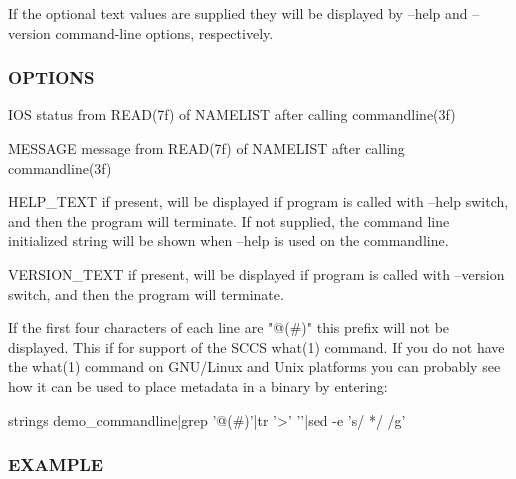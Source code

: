 If the optional text values are supplied they will be displayed by --help and --version command-\/line options, respectively.

\subsubsection*{O\+P\+T\+I\+O\+NS}

\begin{DoxyVerb} IOS           status from READ(7f) of NAMELIST after calling
               commandline(3f)

 MESSAGE       message from READ(7f) of NAMELIST after calling
               commandline(3f)

 HELP_TEXT     if present, will be displayed if program is called with
               --help switch, and then the program will terminate. If
               not supplied, the command line initialized string will be
               shown when --help is used on the commandline.

 VERSION_TEXT  if present, will be displayed if program is called with
               --version switch, and then the program will terminate.

    If the first four characters of each line are "@(#)" this prefix will
    not be displayed. This if for support of the SCCS what(1) command. If
    you do not have the what(1) command on GNU/Linux and Unix platforms
    you can probably see how it can be used to place metadata in a binary
    by entering:

        strings demo_commandline|grep '@(#)'|tr '>' '\n'|sed -e 's/  */ /g'
\end{DoxyVerb}


\subsubsection*{E\+X\+A\+M\+P\+LE}

